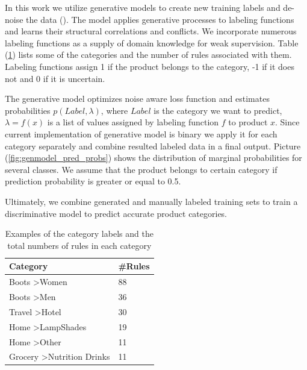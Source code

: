 
In this work we utilize generative models to create new training labels and de-noise the data (\cite{genmodels}). The model applies generative processes to labeling functions and learns their structural correlations and conflicts. We incorporate numerous labeling functions as a supply of domain knowledge for weak supervision. Table (\ref{tab:numrules}) lists some of the categories and the number of rules associated with them. Labeling functions assign 1 if the product belongs to the category, -1 if it does not and 0 if it is uncertain\cite{genmodels}.

The generative model optimizes noise aware loss function and estimates probabilities $p(Label, \lambda)$, where $Label$ is the category we want to predict, $\lambda = f(x)$ is a list of values assigned by labeling function $f$ to product $x$.  Since current implementation of generative model is binary we apply it for each category separately and combine resulted labeled data in a final output. Picture (\ref{fig:genmodel_pred_probs}) shows the distribution of marginal probabilities for several classes. We assume that the product belongs to certain category if prediction probability is greater or equal to 0.5.

Ultimately, we combine generated and manually labeled training sets to train a discriminative model to predict accurate product categories.

\begin{table}
  \caption{Examples of the category labels and the total numbers of rules in each category}
  \label{tab:numrules}
  \begin{tabular}{ll}
    \toprule
    Category & \#Rules\\
    \midrule
    Boots \textgreater Women &	88	\\
    Boots \textgreater Men	& 36 \\
 	Travel \textgreater Hotel & 30 \\
 	Home \textgreater LampShades & 19 \\
 	Home \textgreater Other & 11 \\
 	Grocery \textgreater Nutrition Drinks & 11 \\
    \bottomrule
  \end{tabular}
\end{table}

